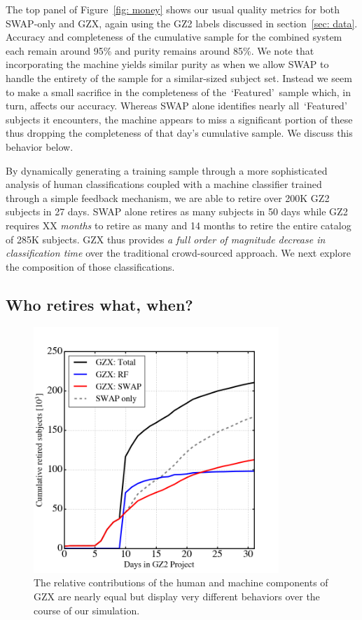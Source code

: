 \documentclass[twocolumn]{aastex6}
\newcommand{\feat}{`Featured'}
\begin{document}
The top panel of Figure~\ref{fig: money} shows our usual quality metrics for both 
SWAP-only and GZX, again using the GZ2 labels discussed in section~\ref{sec: data}.
Accuracy and completeness of the cumulative sample for the combined system 
each remain around 95\% and purity remains around 85\%. We note that 
incorporating the machine yields similar purity as when we 
allow SWAP to handle the entirety of the sample for a similar-sized subject set. 
Instead we seem to make a small sacrifice in the completeness of the~\feat~sample
which, in turn, affects our accuracy. Whereas SWAP alone identifies nearly all~\feat~
subjects it encounters,  the machine appears to miss a significant 
portion of these thus dropping the completeness of that day's 
cumulative sample. We discuss this behavior below.

By dynamically generating a training sample
through a more sophisticated analysis of human classifications coupled with a 
machine classifier trained through a simple feedback mechanism, we are able to 
retire over 200K GZ2 subjects in 27 days.  SWAP alone retires as many subjects in 50 days
while GZ2 requires XX \textit{months} to retire as many and 14 months to retire 
the entire catalog of 285K subjects. 
GZX thus provides \textit{a full order of magnitude decrease in classification time} 
over the traditional crowd-sourced approach. 
We next explore the composition of those classifications.


\subsection{Who retires what, when?}  

\begin{figure}[t!]
\includegraphics[width=3.65in]{figures/GZ2_sup_PLPD5_p5_flipfeature2b_RF_accuracy_redo_raw_combo_GZX_component_contributions.png}
\caption{The relative contributions of the human and machine components of GZX are nearly equal but display very different behaviors over the course of our simulation.  \label{fig: gzx components}}
\end{figure}
\end{document}
